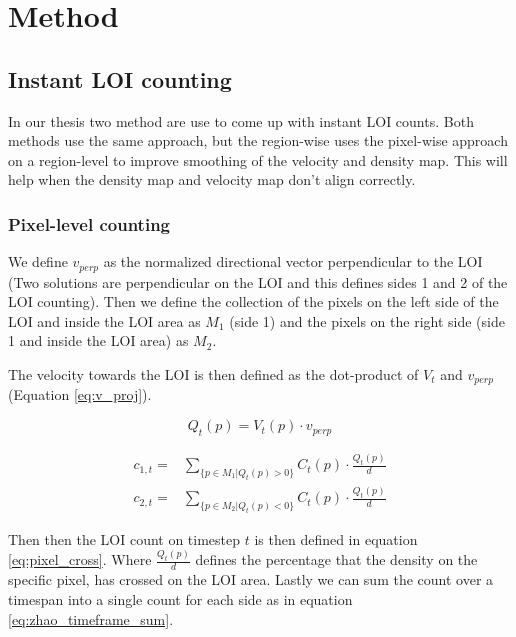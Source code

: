 \chapter{Method}

\section{Instant LOI counting}
In our thesis two method are use to come up with instant LOI counts. Both methods use the same approach, but the region-wise uses the pixel-wise approach on a region-level to improve smoothing of the velocity and density map. This will help when the density map and velocity map don't align correctly.

\subsection{Pixel-level counting}
\label{sec:pixel_level}
We define $v_{perp}$ as the normalized directional vector perpendicular to the LOI (Two solutions are perpendicular on the LOI and this defines sides 1 and 2 of the LOI counting). Then we define the collection of the pixels on the left side of the LOI and inside the LOI area as $M_1$ (side 1) and the pixels on the right side (side 1 and inside the LOI area) as $M_2$.

The velocity towards the LOI is then defined as the dot-product of $V_t$ and $v_{perp}$ (Equation \ref{eq:v_proj}).

\begin{equation}
	Q_t(p) = V_t(p) \cdot v_{perp}
	\label{eq:v_proj}
\end{equation}


\begin{equation}
\begin{aligned}
	c_{1,t} =& \sum_{\{p \in M_1 | Q_t(p) > 0\}} C_t(p) \cdot \frac{Q_t(p)}{d}\\
	c_{2,t} =& \sum_{\{p \in M_2 | Q_t(p) < 0\}} C_t(p) \cdot \frac{Q_t(p)}{d}
\end{aligned}
\label{eq:pixel_cross}
\end{equation}

Then then the LOI count on timestep $t$ is then defined in equation \ref{eq:pixel_cross}. Where $\frac{Q_t(p)}{d}$ defines the percentage that the density on the specific pixel, has crossed on the LOI area. Lastly we can sum the count over a timespan into a single count for each side as in equation \ref{eq:zhao_timeframe_sum}.


